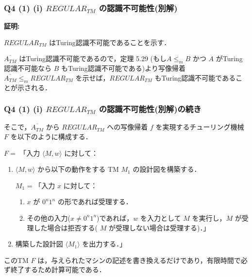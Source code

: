 \begin{frame}[fragile]
\frametitle{Q4 (1) \hspace{3mm} (i) $REGULAR_{TM}$ の認識不可能性(別解)}

\textbf{証明:}

$REGULAR_{TM}$ はTuring認識不可能であることを示す．

$\overline{A_{TM}}$ はTuring認識不可能であるので，定理 5.29 (もし$A \le_{m} B$ かつ $A$ がTuring認識不可能なら $B$ もTuring認識不可能である)より写像帰着 $\overline{A_{TM}} \le_{m} REGULAR_{TM}$ を示せば，$REGULAR_{TM}$ もTuring認識不可能であることが示される．

\end{frame}



\begin{frame}[fragile]
\frametitle{Q4 (1) \hspace{3mm} (i) $REGULAR_{TM}$ の認識不可能性(別解)の続き}

そこで，$\overline{A_{TM}}$ から $REGULAR_{TM}$ への写像帰着 $f$ を実現するチューリング機械 $F$ を以下のように構成する．

$F =$ 「入力 $\langle M, w \rangle$ に対して：

\begin{enumerate}
    \item $\langle M, w \rangle$ から以下の動作をする TM $M_{1}$ の設計図を構築する．

     $M_{1}$ = 「入力 $x$ に対して：

    \begin{enumerate}
        \item[1.] $x$ が $0^{n}1^{n}$ の形であれば受理する．
        \item[2.] その他の入力($x \neq 0^{n}1^{n}$)であれば，$w$ を入力として $M$ を実行し，$M$ が受理した場合は拒否する( $M$ が受理しない場合は受理する)．」
    \end{enumerate}

    \item 構築した設計図 $\langle M_{1} \rangle$ を出力する．」

\end{enumerate}

このTM $F$ は，与えられたマシンの記述を書き換えるだけであり，有限時間で必ず終了するため計算可能である．

\end{frame}



